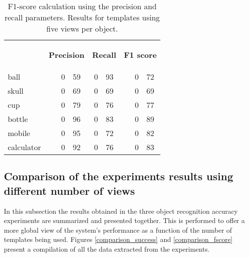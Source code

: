 \begin{table}[H]
\centering
\begin{tabular} {l l r@{.}l r@{.}l l r@{.}l }
\toprule
\addlinespace[3mm]
   \multicolumn{1}{c}{\begin{center}\textbf{Object}\end{center}} &
   \multicolumn{3}{c}{\begin{center}\textbf{Precision}\end{center}} &
   \multicolumn{2}{c}{\begin{center}\textbf{Recall}\end{center}} &
   \multicolumn{3}{c}{\begin{center}\hspace*{0.2cm}\textbf{F1 score}\end{center}} &\\
\addlinespace[-3mm]

\midrule
ball		&&	0&59 	&	0&93	&&	0&72	\\
skull		&&	0&69	&	0&69	&&	0&69	\\
cup			&&	0&79	&	0&76	&&	0&77	\\
bottle		&&	0&96	&	0&83	&&	0&89	\\
mobile		&&	0&95	&	0&72	&&	0&82	\\
calculator	&&	0&92	&	0&76	&&	0&83	\\

\bottomrule
\end{tabular}
\caption[F1-score - templates using 5 views]{F1-score calculation using the precision and recall parameters. Results for templates using five views per object. }
\label{10views_fscore}
\end{table}



	\subsection{Comparison of the experiments results using different number of views}

	In this subsection the results obtained in the three object recognition accuracy experiments are summarized and presented together. 
	This is performed to offer a more global view of the system's performance as a function of the number of templates being used. 
	Figures \ref{comparison_success} and \ref{comparison_fscore} present a compilation of all the data extracted from the experiments. 
	\\



